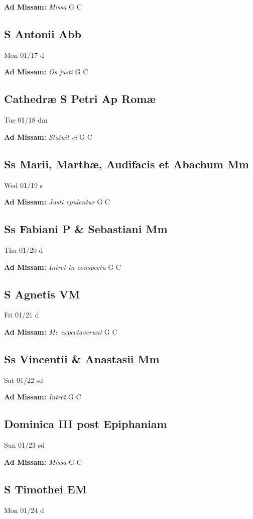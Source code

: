 \documentclass[letterpaper, 10pt, twocolumn]{article}
\begin{document}
\textbf{Ad Missam:} \textit{Missa} G C 

\subsection*{S Antonii Abb}Mon 01/17 d

\textbf{Ad Missam:} \textit{Os justi} G C 

\subsection*{Cathedræ S Petri Ap Romæ}Tue 01/18 dm

\textbf{Ad Missam:} \textit{Statuit ei} G C 

\subsection*{Ss Marii, Marthæ, Audifacis et Abachum Mm}Wed 01/19 s

\textbf{Ad Missam:} \textit{Justi epulentur} G C 

\subsection*{Ss Fabiani P \& Sebastiani Mm}Thu 01/20 d

\textbf{Ad Missam:} \textit{Intret in conspectu} G C 

\subsection*{S Agnetis VM}Fri 01/21 d

\textbf{Ad Missam:} \textit{Me expectaverunt} G C 

\subsection*{Ss Vincentii \& Anastasii Mm}Sat 01/22 sd

\textbf{Ad Missam:} \textit{Intret} G C 

\subsection*{Dominica III post Epiphaniam}Sun 01/23 sd

\textbf{Ad Missam:} \textit{Missa} G C 

\subsection*{S Timothei EM}Mon 01/24 d
\end{document}
